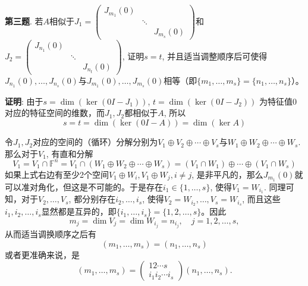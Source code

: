 \newpageorvspace

{\bf 第三题}. 若$A$相似于$J_1 = \begin{pmatrix} J_{m_1}(0) & & \\ & \ddots & \\ & & J_{m_s}(0) \end{pmatrix}$和$J_2 = \begin{pmatrix} J_{n_1}(0) & & \\ & \ddots & \\ & & J_{n_t}(0) \end{pmatrix}$, 证明$s=t$, 并且适当调整顺序后可使得$J_{n_1}(0), \ldots, J_{n_s}(0)$与$J_{m_1}(0), \ldots, J_{m_s}(0)$相等（即$\{ m_1, \ldots, m_s \} = \{ n_1, \ldots, n_s \}$）。

{\bf 证明}: 由于$s = \dim (\ker (0 I - J_1))$, $t = \dim (\ker (0 I - J_2))$ 为特征值$0$对应的特征空间的维数，而$J_1, J_2$都相似于$A$, 所以
$$s = t = \dim(\ker (0 I - A)) = \dim(\ker A)$$

令$J_1, J_2$对应的空间的（循环）分解分别为$V_1\oplus V_2 \oplus \cdots \oplus V_s$与$W_1\oplus W_2 \oplus \cdots \oplus W_s$. 那么对于$V_1$, 有直和分解
$$V_1 = V_1 \cap \mathbb{F}^n = V_1 \cap (W_1\oplus W_2 \oplus \cdots \oplus W_s) = (V_1 \cap W_1) \oplus \cdots \oplus (V_1 \cap W_s)$$
如果上式右边有至少2个空间$V_1 \oplus W_i, V_1 \oplus W_j, i\neq j$, 是非平凡的，那么$J_{m_1}(0)$就可以准对角化，但这是不可能的。于是存在$i_1 \in \{1, \ldots, s\}$, 使得$V_1 = W_{i_1}$. 同理可知，对于$V_2, \ldots, V_s$, 都分别存在$i_2, \ldots, i_s$, 使得$V_2 = W_{i_2}, \ldots, V_s = W_{i_s}$, 而且这些$i_1, i_2, \ldots, i_s$显然都是互异的，即$\{i_1, \ldots, i_s\} = \{1, 2, \ldots, s\}$。因此
$$m_j = \dim V_j = \dim W_{i_j} = n_{i_j}, \quad j = 1, 2, \ldots, s,$$
从而适当调换顺序之后有
$$(m_1, \ldots, m_s) = (n_1, \ldots, n_s)$$
或者更准确来说，是
$$(m_1, \ldots, m_s) = \begin{pmatrix} 1 2 \cdots s \\ i_1 i_2 \cdots i_s \end{pmatrix} (n_1, \ldots, n_s).$$



